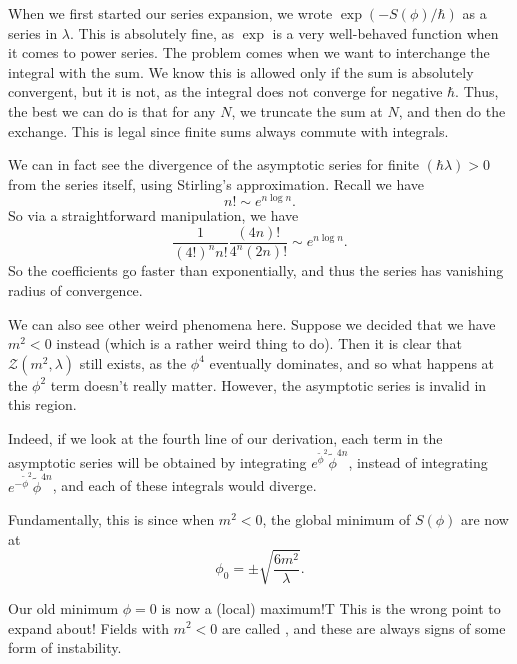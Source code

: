\documentclass[a4paper]{article}
\begin{document}
When we first started our series expansion, we wrote $\exp(-S(\phi)/\hbar)$ as a series in $\lambda$. This is absolutely fine, as $\exp$ is a very well-behaved function when it comes to power series. The problem comes when we want to interchange the integral with the sum. We know this is allowed only if the sum is absolutely convergent, but it is not, as the integral does not converge for negative $\hbar$. Thus, the best we can do is that for any $N$, we truncate the sum at $N$, and then do the exchange. This is legal since finite sums always commute with integrals.

We can in fact see the divergence of the asymptotic series for finite $(\hbar \lambda) > 0$ from the series itself, using Stirling's approximation. Recall we have
\[
  n! \sim e^{n \log n}.
\]
So via a straightforward manipulation, we have
\[
  \frac{1}{(4!)^n n!} \frac{(4n)!}{4^n(2n)!} \sim e^{n \log n}.
\]
So the coefficients go faster than exponentially, and thus the series has vanishing radius of convergence.

We can also see other weird phenomena here. Suppose we decided that we have $m^2 < 0$ instead (which is a rather weird thing to do). Then it is clear that $\mathcal{Z}(m^2, \lambda)$ still exists, as the $\phi^4$ eventually dominates, and so what happens at the $\phi^2$ term doesn't really matter. However, the asymptotic series is invalid in this region.

Indeed, if we look at the fourth line of our derivation, each term in the asymptotic series will be obtained by integrating $e^{\tilde\phi^2} \tilde\phi^{4n}$, instead of integrating $e^{-\tilde\phi^2} \tilde\phi^{4n}$, and each of these integrals would diverge.

Fundamentally, this is since when $m^2 < 0$, the global minimum of $S(\phi)$ are now at
\[
  \phi_0 = \pm \sqrt{\frac{6m^2}{\lambda}}.
\]
\begin{center}
\end{center}
Our old minimum $\phi = 0$ is now a (local) maximum!T This is the wrong point to expand about! Fields with $m^2 < 0$ are called , and these are always signs of some form of instability.
\end{document}
